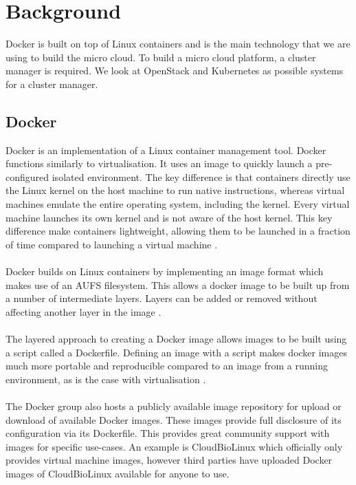 \documentclass{sig-alternate-05-2015}
\begin{document}
\section{Background}
Docker is built on top of Linux containers and is the main technology that we are using to build the micro cloud. To build a micro cloud platform, a cluster manager is required. We look at OpenStack and Kubernetes as possible systems for a cluster manager.


\subsection{Docker}
Docker is an implementation of a Linux container management tool. Docker functions similarly to virtualisation. It uses an image to quickly launch a pre-configured isolated environment. The key difference is that containers directly use the Linux kernel on the host machine to run native instructions, whereas virtual machines emulate the entire operating system, including the kernel. Every virtual machine launches its own kernel and is not aware of the host kernel. This key difference make containers lightweight, allowing them to be launched in a fraction of time compared to launching a virtual machine \cite{joy2015performance}. 
\\\\
Docker builds on Linux containers by implementing an image format which makes use of an AUFS filesystem. This allows a docker image to be built up from a number of intermediate layers. Layers can be added or removed without affecting another layer in the image \cite{boettiger2014introduction}.
\\\\
The layered approach to creating a Docker image allows images to be built using a script called a Dockerfile. Defining an image with a script makes docker images much more portable and reproducible compared to an image from a running environment, as is the case with virtualisation \cite{boettiger2014introduction}.
\\\\
The Docker group also hosts a publicly available image repository for upload or download of available Docker images. These images provide full disclosure of its configuration via its Dockerfile. This provides great community support with images for specific use-cases. An example is CloudBioLinux which officially only provides virtual machine images, however third parties have uploaded Docker images of CloudBioLinux available for anyone to use.
\end{document}
